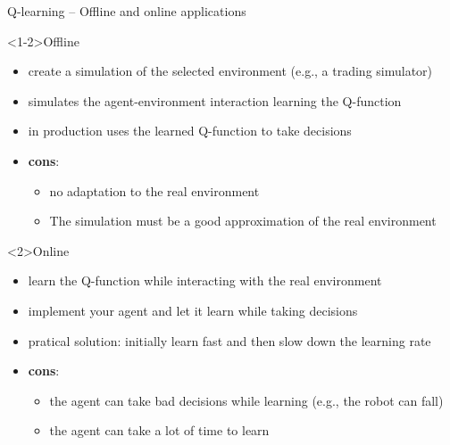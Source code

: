 \documentclass[presentation, 9pt]{beamer}\mode<presentation>{\usetheme{AMSBolognaFC}}
\begin{document}
\begin{frame}{Q-learning -- Offline and online applications}
\begin{exampleblock}<1-2>{Offline}
	\begin{itemize}
		\item create a simulation of the selected environment (e.g., a trading simulator)
		\item simulates the agent-environment interaction learning the Q-function
		\item in production uses the learned Q-function to take decisions
		\item \textbf{cons}: 
		\begin{itemize}
			\item no adaptation to the real environment
			\item The simulation must be a good approximation of the real environment
		\end{itemize}
	\end{itemize}
\end{exampleblock}
\begin{alertblock}<2>{Online}
	\begin{itemize}
		\item learn the Q-function while interacting with the real environment
		\item implement your agent and let it learn while taking decisions
		\item pratical solution: initially learn fast and then slow down the learning rate
		\item \textbf{cons}:
		\begin{itemize}
			\item the agent can take bad decisions while learning (e.g., the robot can fall)
			\item the agent can take a lot of time to learn
		\end{itemize}
	\end{itemize}
\end{alertblock}
\end{frame}
\end{document}
